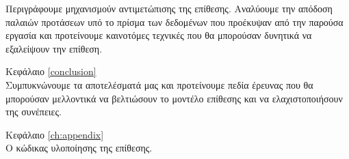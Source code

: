 \begin{description}
Περιγράφουμε μηχανισμούν αντιμετώπισης της επίθεσης. Αναλύουμε την απόδοση
παλαιών προτάσεων υπό το πρίσμα των δεδομένων που προέκυψαν από την παρούσα
εργασία και προτείνουμε καινοτόμες τεχνικές που θα μπορούσαν δυνητικά να
εξαλείψουν την επίθεση.\hfill \\

\item{Κεφάλαιο \ref{conclusion}} \hfill \\

Συμπυκνώνουμε τα αποτελέσματά μας και προτείνουμε πεδία έρευνας που θα μπορούσαν
μελλοντικά να βελτιώσουν το μοντέλο επίθεσης και να ελαχιστοποιήσουν της
συνέπειες.\hfill \\

\item{Κεφάλαιο \ref{ch:appendix}} \hfill \\

Ο κώδικας υλοποίησης της επίθεσης.  \end{description}

